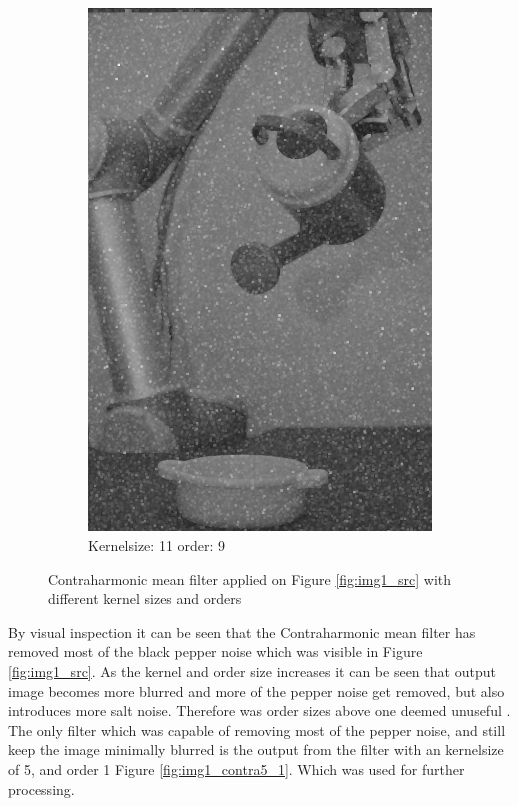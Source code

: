 \begin{figure}[H]
\begin{subfigure}[b]{0.30\textwidth}
        \includegraphics[width=\textwidth]{img1/img_1_gaus_11_9.png}
        \caption{Kernelsize: 11 order: 9}
		 \label{fig:img1_contra11_9}
    \end{subfigure}
    \caption{Contraharmonic mean filter applied on Figure \ref{fig:img1_src} with different kernel sizes and orders}
    \label{fig:img1_contra}
\end{figure}

By visual inspection it can be seen that the Contraharmonic mean filter has removed most of the black pepper noise which was visible in Figure \ref{fig:img1_src}. As the kernel and order size increases it can be seen that output image becomes more blurred and more of the pepper noise  get removed, but also introduces more  salt noise.  Therefore was order sizes above one deemed unuseful .   The only filter which was capable of removing most of the pepper noise, and still keep the image minimally blurred is the output from the filter with an kernelsize of 5, and order 1 Figure \ref{fig:img1_contra5_1}. Which was used for further processing. \\

